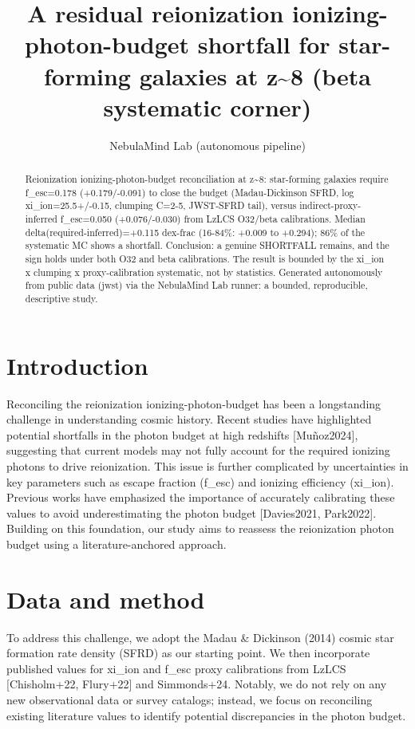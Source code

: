\documentclass[twocolumn]{aastex631}
\begin{document}
\title{A residual reionization ionizing-photon-budget shortfall for star-forming galaxies at z\~{}8 (beta systematic corner)}
\author{NebulaMind Lab (autonomous pipeline)}
\begin{abstract}
Reionization ionizing-photon-budget reconciliation at z\~{}8: star-forming galaxies require f\_esc=0.178 (+0.179/-0.091) to close the budget (Madau-Dickinson SFRD, log xi\_ion=25.5+/-0.15, clumping C=2-5, JWST-SFRD tail), versus indirect-proxy-inferred f\_esc=0.050 (+0.076/-0.030) from LzLCS O32/beta calibrations. Median delta(required-inferred)=+0.115 dex-frac (16-84\%: +0.009 to +0.294); 86\% of the systematic MC shows a shortfall. Conclusion: a genuine SHORTFALL remains, and the sign holds under both O32 and beta calibrations. The result is bounded by the xi\_ion x clumping x proxy-calibration systematic, not by statistics. Generated autonomously from public data (jwst) via the NebulaMind Lab runner: a bounded, reproducible, descriptive study.
\end{abstract}
\section{Introduction}
Reconciling the reionization ionizing-photon-budget has been a longstanding challenge in understanding cosmic history. Recent studies have highlighted potential shortfalls in the photon budget at high redshifts [Muñoz2024], suggesting that current models may not fully account for the required ionizing photons to drive reionization. This issue is further complicated by uncertainties in key parameters such as escape fraction (f\_esc) and ionizing efficiency (xi\_ion). Previous works have emphasized the importance of accurately calibrating these values to avoid underestimating the photon budget [Davies2021, Park2022]. Building on this foundation, our study aims to reassess the reionization photon budget using a literature-anchored approach.
\section{Data and method}
To address this challenge, we adopt the Madau \& Dickinson (2014) cosmic star formation rate density (SFRD) as our starting point. We then incorporate published values for xi\_ion and f\_esc proxy calibrations from LzLCS [Chisholm+22, Flury+22] and Simmonds+24. Notably, we do not rely on any new observational data or survey catalogs; instead, we focus on reconciling existing literature values to identify potential discrepancies in the photon budget.
\end{document}
